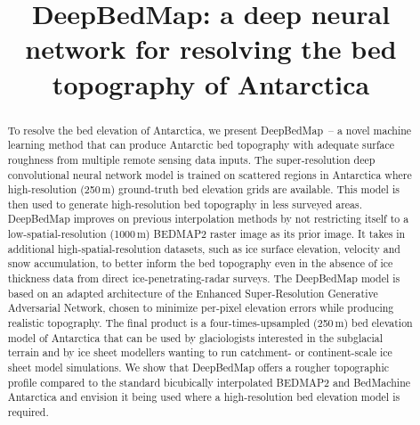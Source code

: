 \documentclass[tc, noline]{copernicus}
\begin{document}
\title{DeepBedMap: a deep neural network for resolving the bed topography of Antarctica}






\published{}


\maketitle

\begin{abstract}
To resolve the bed elevation of Antarctica, we present DeepBedMap~-- a novel machine learning method that can produce Antarctic bed topography with
  adequate surface roughness from multiple remote sensing data inputs. The super-resolution deep convolutional neural network model is trained on
  scattered regions in Antarctica where high-resolution (250\,\unit{m}) ground-truth bed elevation grids are available. This model is then used to
  generate high-resolution bed topography in less surveyed areas. DeepBedMap improves on previous interpolation methods by not restricting itself to a
  low-spatial-resolution (1000\,\unit{m}) BEDMAP2 raster image as its prior image. It takes in additional high-spatial-resolution datasets, such as ice
  surface elevation, velocity and snow accumulation, to better inform the bed topography even in the absence of ice thickness data from direct
  ice-penetrating-radar surveys. The DeepBedMap model is based on an adapted architecture of the Enhanced Super-Resolution Generative Adversarial Network,
  chosen to minimize per-pixel elevation errors while producing realistic topography. The final product is a four-times-upsampled (250\,\unit{m}) bed
  elevation model of Antarctica that can be used by glaciologists interested in the subglacial terrain and by ice sheet modellers wanting to run
  catchment- or continent-scale ice sheet model simulations. We show that DeepBedMap offers a rougher topographic profile compared to the standard
  bicubically interpolated BEDMAP2 and BedMachine Antarctica and envision it being used where a high-resolution bed elevation model is required.
\end{abstract}
\end{document}
